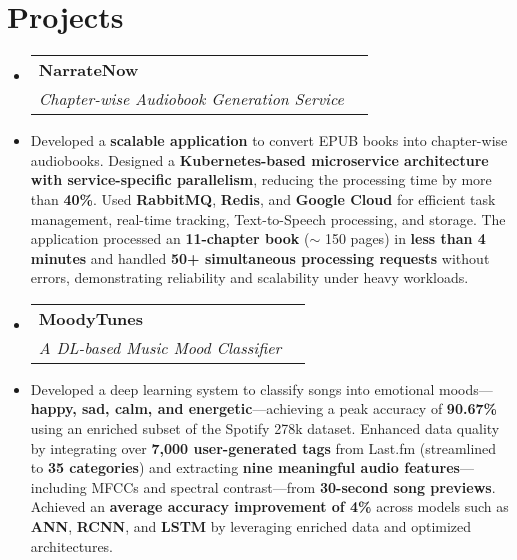 \documentclass[letter,20pt]{article}
\makeatletter
\newcommand{\resumeItemWithoutTitle}[1]{
  \item\small{
    {\vspace{-2pt}}
  }
}
\newcommand{\resumeSubheading}[4]{
  \vspace{-1pt}\item
    \begin{tabular*}{0.97\textwidth}{l@{\extracolsep{\fill}}r}
      \textbf{#1} & #2 \\
      \textit{#3} & \textit{#4} \\
    \end{tabular*}\vspace{-5pt}
}
\newcommand{\resumeSubHeadingListStart}{\begin{itemize}[leftmargin=*]}
\newcommand{\resumeSubHeadingListEnd}{\end{itemize}\vspace{-8pt}}
\newcommand{\resumeItemListStart}{\begin{itemize}[label={--}, leftmargin=*]}
\newcommand{\resumeItemListEnd}{\end{itemize}\vspace{-5pt}}
\makeatother
\begin{document}
\section{Projects}
\resumeSubHeadingListStart
    \resumeSubheading{NarrateNow}{}{Chapter-wise Audiobook Generation Service}{}
\resumeSubHeadingListEnd
\resumeItemListStart
    \resumeItemWithoutTitle{}{Developed a \textbf{scalable application} to convert EPUB books into chapter-wise audiobooks. Designed a \textbf{Kubernetes-based microservice architecture with service-specific parallelism}, reducing the processing time by more than \textbf{ 40\%}. Used \textbf{RabbitMQ}, \textbf{Redis}, and\textbf{ Google Cloud} for efficient task management, real-time tracking, Text-to-Speech processing, and storage. The application processed an \textbf{11-chapter book} ($\sim$ 150 pages) in \textbf{less than 4 minutes} and handled \textbf{50+ simultaneous processing requests} without errors, demonstrating reliability and scalability under heavy workloads.}
    
\resumeItemListEnd

\resumeSubHeadingListStart
    \resumeSubheading{MoodyTunes}{}{A DL-based Music Mood Classifier}{}
\resumeSubHeadingListEnd
\resumeItemListStart
    \resumeItemWithoutTitle{}{Developed a deep learning system to classify songs into emotional moods—\textbf{happy, sad, calm, and energetic}—achieving a peak accuracy of \textbf{90.67\%} using an enriched subset of the Spotify 278k dataset. Enhanced data quality by integrating over \textbf{7,000 user-generated tags} from Last.fm (streamlined to \textbf{35 categories}) and extracting \textbf{nine meaningful audio features}—including MFCCs and spectral contrast—from \textbf{30-second song previews}. Achieved an \textbf{average accuracy improvement of 4\%} across models such as \textbf{ANN}, \textbf{RCNN}, and \textbf{LSTM} by leveraging enriched data and optimized architectures.}
\resumeItemListEnd



    
\end{document}
